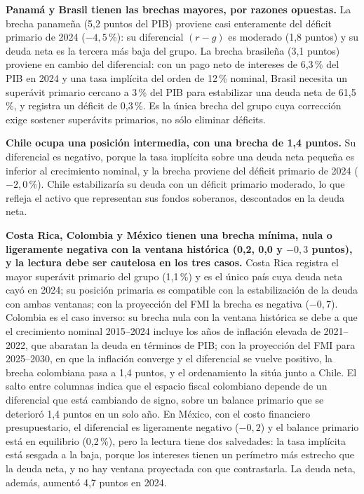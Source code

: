 \documentclass[12pt, letterpaper]{article}
\begin{document}
\textbf{Panamá y Brasil tienen las brechas mayores, por razones opuestas.} La
brecha panameña (5,2 puntos del PIB) proviene casi enteramente del déficit
primario de 2024 ($-4{,}5$\,\%): su diferencial $(r-g)$ es moderado (1,8 puntos) y su deuda neta es la tercera más baja del grupo.
La brecha brasileña (3,1 puntos) proviene en cambio del diferencial: con un pago
neto de intereses de 6,3\,\% del PIB en 2024 y una tasa implícita del orden de
12\,\% nominal, Brasil necesita un superávit primario cercano a 3\,\% del PIB para
estabilizar una deuda neta de 61,5\,\%, y registra un déficit de 0,3\,\%. Es la
única brecha del grupo cuya corrección exige sostener superávits primarios, no
sólo eliminar déficits.

\textbf{Chile ocupa una posición intermedia, con una brecha de 1,4 puntos.} Su
diferencial es negativo, porque la tasa implícita sobre una deuda neta pequeña es
inferior al crecimiento nominal, y la brecha proviene del déficit primario de
2024 ($-2{,}0$\,\%). Chile estabilizaría su deuda con un déficit primario
moderado, lo que refleja el activo que representan sus fondos soberanos,
descontados en la deuda neta.

\textbf{Costa Rica, Colombia y México tienen una brecha mínima, nula o
ligeramente negativa con la ventana histórica (0,2, 0,0 y $-0{,}3$ puntos), y la
lectura debe ser cautelosa en los tres casos.} Costa Rica registra el mayor superávit
primario del grupo (1,1\,\%) y es el único país cuya deuda neta cayó en 2024; su
posición primaria es compatible con la estabilización de la deuda con ambas
ventanas; con la proyección del FMI la brecha es negativa ($-0{,}7$). Colombia es el caso inverso: su brecha
nula con la ventana histórica se debe a que el crecimiento nominal 2015--2024
incluye los años de inflación elevada de 2021--2022, que abaratan la deuda en
términos de PIB; con la proyección del FMI para 2025--2030, en que la inflación
converge y el diferencial se vuelve positivo, la brecha colombiana pasa a 1,4
puntos, y el ordenamiento la sitúa junto a Chile. El salto entre columnas indica
que el espacio fiscal colombiano depende de un diferencial que está cambiando de signo, sobre un balance primario
que se deterioró 1,4 puntos en un solo año. En México, con el costo financiero
presupuestario, el diferencial es ligeramente negativo ($-0{,}2$) y el balance
primario está en equilibrio (0,2\,\%), pero la lectura tiene dos salvedades: la
tasa implícita está sesgada a la baja, porque los intereses tienen un perímetro
más estrecho que la deuda neta, y no hay ventana proyectada con que contrastarla.
La deuda neta, además, aumentó 4,7 puntos en 2024.
\end{document}
